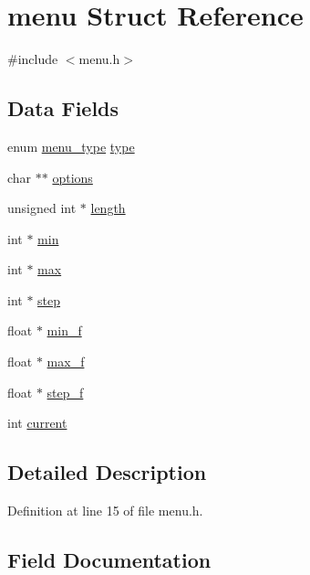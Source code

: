 \hypertarget{structmenu}{}\section{menu Struct Reference}
\label{structmenu}


{\ttfamily \#include $<$menu.\+h$>$}

\subsection*{Data Fields}
\begin{DoxyCompactItemize}
\item 
enum \hyperlink{menu_8h_a6bbf4baf5018b0d76aab6c2e6bf85e62}{menu\+\_\+type} \hyperlink{structmenu_ae131df142b529116ec8300a3c59b14be}{type}
\item 
char $\ast$$\ast$ \hyperlink{structmenu_afefe8f715b91a6c68097ec7503dd6020}{options}
\item 
unsigned int $\ast$ \hyperlink{structmenu_ad42d625fa749b07c73c9ae28ea4c3bd2}{length}
\item 
int $\ast$ \hyperlink{structmenu_aea9f5a2490568cd16f46c29df1106fc1}{min}
\item 
int $\ast$ \hyperlink{structmenu_a0cfebdbd2ba1d9ae782a6cd77f734e9e}{max}
\item 
int $\ast$ \hyperlink{structmenu_a985265c90800ba09664f71e134dd5786}{step}
\item 
float $\ast$ \hyperlink{structmenu_a52d27cf45e46c52138c1a6bc4e46773d}{min\+\_\+f}
\item 
float $\ast$ \hyperlink{structmenu_a70e64637ad619d8d1f0bca19af45f169}{max\+\_\+f}
\item 
float $\ast$ \hyperlink{structmenu_ad30508910252066b5c8e1c574080b736}{step\+\_\+f}
\item 
int \hyperlink{structmenu_ab04e2d55ea4a544f3575812582af7b51}{current}
\end{DoxyCompactItemize}


\subsection{Detailed Description}


Definition at line 15 of file menu.\+h.



\subsection{Field Documentation}
\mbox{\label{structmenu_ab04e2d55ea4a544f3575812582af7b51}} 
